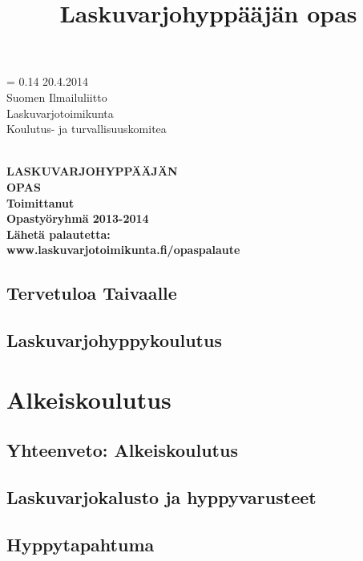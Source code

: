 \documentclass[10pt,twoside,openany,hidelinks]{memoir}
\title{Laskuvarjohyppääjän opas}
\renewcommand*{\parttitlefont}{\sffamily\fontsize{42pt}{1em}\bfseries}
\newcommand*{\titleDB}{\begingroup%
\tdrop = 0.14\txtheight
\sffamily
\raggedleft
\Large
{20.4.2014} 
\Huge
\vspace*{\baselineskip} \\
{Suomen Ilmailuliitto}\\[0.3\baselineskip]
{Laskuvarjotoimikunta}\\[0.3\baselineskip]
{Koulutus- ja turvallisuuskomitea}\\[0.2\baselineskip]
\hrulefill 
\vspace*{0.4\baselineskip} \\
\raggedright
\parttitlefont
{LASKUVARJOHYPPÄÄJÄN}\\[\baselineskip]
{OPAS}\\[2\baselineskip]
\LARGE
{Toimittanut}\\[0.3\baselineskip]
{Opastyöryhmä 2013-2014}\\[0.3\baselineskip]
\vfill
\LARGE
{Lähetä palautetta:}\\
{www.laskuvarjotoimikunta.fi/opaspalaute}\\
\endgroup}
\begin{document}
\frontmatter

\pagestyle{empty}
\titleDB
\newpage

\pagestyle{headings}
\tableofcontents

\chapter{Tervetuloa Taivaalle}
\label{tervetuloa-taivaalle}
\thispagestyle{headings}
\begin{multicols}{2}
\end{multicols}

\chapter{Laskuvarjohyppykoulutus}
\label{laskuvarjohyppykoulutus}
\thispagestyle{headings}
\begin{multicols}{2}
\end{multicols}

\mainmatter\midsloppy\part{Alkeiskoulutus}\chapter{Yhteenveto: Alkeiskoulutus}
\label{yhteenveto-alkeiskoulutus}
\thispagestyle{headings}
\begin{multicols}{2}
\end{multicols}

\chapter{Laskuvarjokalusto ja hyppyvarusteet}
\label{laskuvarjokalusto-ja-hyppyvarusteet}
\thispagestyle{headings}
\begin{multicols}{2}
\end{multicols}

\chapter{Hyppytapahtuma}
\label{hyppytapahtuma}
\thispagestyle{headings}
\begin{multicols}{2}
\end{multicols}
\end{document}
